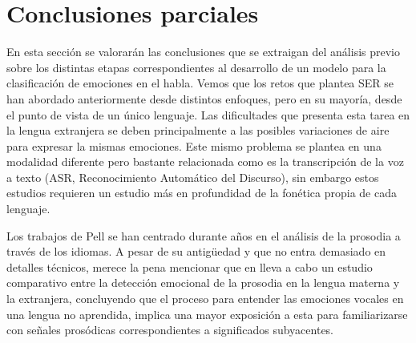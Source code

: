 \documentclass[11pt,a4paper,spanish]{book}
\begin{document}
	\section{Conclusiones parciales}
En esta sección se valorarán las conclusiones que se extraigan del análisis previo sobre los distintas etapas correspondientes al desarrollo de un modelo para la clasificación de emociones en el habla. Vemos que los retos que plantea SER se han abordado anteriormente desde distintos enfoques, pero en su mayoría, desde el punto de vista de un único lenguaje. Las dificultades que presenta esta tarea en la lengua extranjera se deben principalmente a las posibles variaciones de aire para expresar la mismas emociones. Este mismo problema se plantea en una modalidad diferente pero bastante relacionada como es la transcripción de la voz a texto (ASR, Reconocimiento Automático del Discurso), sin embargo estos estudios requieren un estudio más en profundidad de la fonética propia de cada lenguaje.
	
	Los trabajos de Pell se han centrado durante años en el análisis de la prosodia a través de los idiomas. A pesar de su antigüedad y que no entra demasiado en detalles técnicos, merece la pena mencionar que en \cite{Pell2008} lleva a cabo un estudio comparativo entre la detección emocional de la prosodia en la lengua materna y la extranjera, concluyendo que el proceso para entender las emociones vocales en una lengua no aprendida, implica una mayor exposición a esta para familiarizarse con señales prosódicas correspondientes a significados subyacentes.\hfill \break
	
\end{document}
